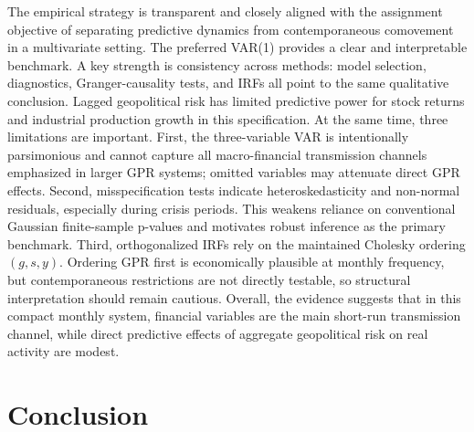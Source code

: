 \documentclass[12pt]{article}
\begin{document}
The empirical strategy is transparent and closely aligned with the assignment objective of separating predictive dynamics from contemporaneous comovement in a multivariate setting. The preferred VAR(1) provides a clear and interpretable benchmark.
\newline
A key strength is consistency across methods: model selection, diagnostics, Granger-causality tests, and IRFs all point to the same qualitative conclusion. Lagged geopolitical risk has limited predictive power for stock returns and industrial production growth in this specification.
\newline
\newline
At the same time, three limitations are important. First, the three-variable VAR is intentionally parsimonious and cannot capture all macro-financial transmission channels emphasized in larger GPR systems; omitted variables may attenuate direct GPR effects.
\newline
Second, misspecification tests indicate heteroskedasticity and non-normal residuals, especially during crisis periods. This weakens reliance on conventional Gaussian finite-sample p-values and motivates robust inference as the primary benchmark.
\newline
Third, orthogonalized IRFs rely on the maintained Cholesky ordering $(g,s,y)$. Ordering GPR first is economically plausible at monthly frequency, but contemporaneous restrictions are not directly testable, so structural interpretation should remain cautious.
\newline
\newline
Overall, the evidence suggests that in this compact monthly system, financial variables are the main short-run transmission channel, while direct predictive effects of aggregate geopolitical risk on real activity are modest.

\section{Conclusion}
\end{document}
